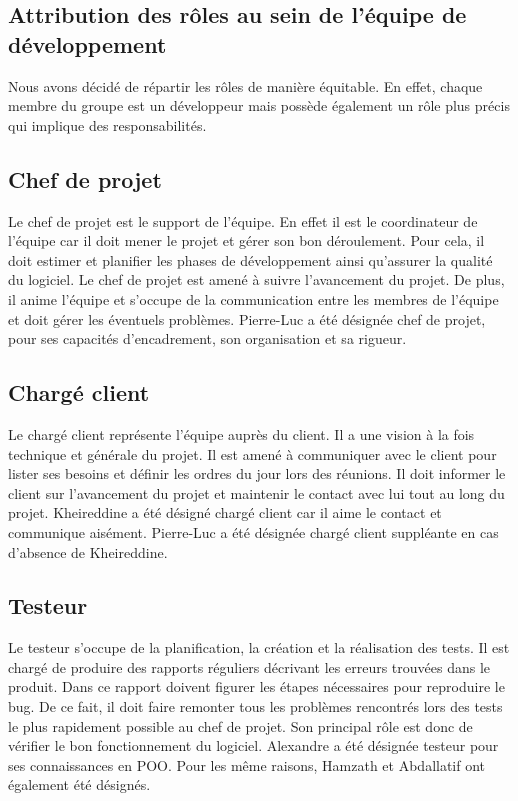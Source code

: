 \documentclass{../res/univ-projet}
\begin{document}
  \subsection{Attribution des rôles au sein de l’équipe de développement}
    Nous avons décidé de répartir les rôles de manière équitable. En effet, chaque membre du groupe est un développeur mais possède également un rôle plus précis qui implique des responsabilités.
  \subsection{Chef de projet}
    Le chef de projet est le support de l’équipe. En effet il est le coordinateur de l’équipe car il doit mener le projet et gérer son bon déroulement. Pour cela, il doit estimer et planifier les phases de développement ainsi qu’assurer la qualité du logiciel. Le chef de projet est amené à suivre l’avancement du projet. De plus, il anime l’équipe et s’occupe de la communication entre les membres de l’équipe et doit gérer les éventuels problèmes. Pierre-Luc a été désignée chef de projet, pour ses capacités d’encadrement, son organisation et sa rigueur.
  \subsection{Chargé client}
    Le chargé client représente l’équipe auprès du client. Il a une vision à la fois technique et générale du projet. Il est amené à communiquer avec le client pour lister ses besoins et définir les ordres du jour lors des réunions. Il doit informer le client sur l’avancement du projet et maintenir le contact avec lui tout au long du projet.
    Kheireddine a été désigné chargé client car il aime le contact et communique aisément. Pierre-Luc a été désignée chargé client suppléante en cas d’absence de Kheireddine.
  \subsection{Testeur}
    Le testeur s’occupe de la planification, la création et la réalisation des tests. Il est chargé de produire des rapports réguliers décrivant les erreurs trouvées dans le produit. Dans ce rapport doivent figurer les étapes nécessaires pour reproduire le bug. De ce fait, il doit faire remonter tous les problèmes rencontrés lors des tests le plus rapidement possible au chef de projet. Son principal rôle est donc de vérifier le bon fonctionnement du logiciel. Alexandre a été désignée testeur pour ses connaissances en POO. Pour les même raisons, Hamzath et Abdallatif ont également été désignés.
\end{document}
